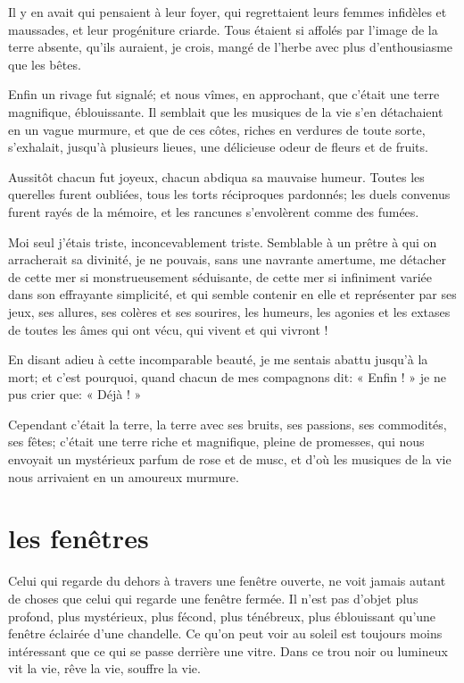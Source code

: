 Il y en avait qui pensaient à leur foyer, qui regrettaient leurs femmes
infidèles et maussades, et leur progéniture criarde. Tous étaient si
affolés par l’image de la terre absente,
qu’ils auraient, je crois, mangé de
l’herbe avec plus d’enthousiasme que
les bêtes.

Enfin un rivage fut signalé; et nous vîmes, en approchant, que
c’était une terre magnifique, éblouissante. Il
semblait que les musiques de la vie s’en détachaient
en un vague murmure, et que de ces côtes, riches en verdures de toute
sorte, s’exhalait, jusqu’à plusieurs
lieues, une délicieuse odeur de fleurs et de fruits.

Aussitôt chacun fut joyeux, chacun abdiqua sa mauvaise humeur. Toutes
les querelles furent oubliées, tous les torts réciproques pardonnés;
les duels convenus furent rayés de la mémoire, et les rancunes
s’envolèrent comme des fumées.

Moi seul j’étais triste, inconcevablement triste.
Semblable à un prêtre à qui on arracherait sa divinité, je ne pouvais,
sans une navrante amertume, me détacher de cette mer si monstrueusement
séduisante, de cette mer si infiniment variée dans son effrayante
simplicité, et qui semble contenir en elle et représenter par ses jeux,
ses allures, ses colères et ses sourires, les humeurs, les agonies et
les extases de toutes les âmes qui ont vécu, qui vivent et qui vivront
!

En disant adieu à cette incomparable beauté, je me sentais abattu
jusqu’à la mort; et c’est pourquoi,
quand chacun de mes compagnons dit: « Enfin ! » je ne pus crier que: «
Déjà ! »

Cependant c’était la terre, la terre avec ses bruits,
ses passions, ses commodités, ses fêtes; c’était une
terre riche et magnifique, pleine de promesses, qui nous envoyait un
mystérieux parfum de rose et de musc, et d’où les
musiques de la vie nous arrivaient en un amoureux murmure.

\quebra\section[Les fenêtres]{les fenêtres} 

Celui qui regarde du dehors à travers une fenêtre ouverte, ne voit
jamais autant de choses que celui qui regarde une fenêtre fermée. Il
n’est pas d’objet plus profond, plus
mystérieux, plus fécond, plus ténébreux, plus éblouissant
qu’une fenêtre éclairée d’une
chandelle. Ce qu’on peut voir au soleil est toujours
moins intéressant que ce qui se passe derrière une vitre. Dans ce trou
noir ou lumineux vit la vie, rêve la vie, souffre la vie.

